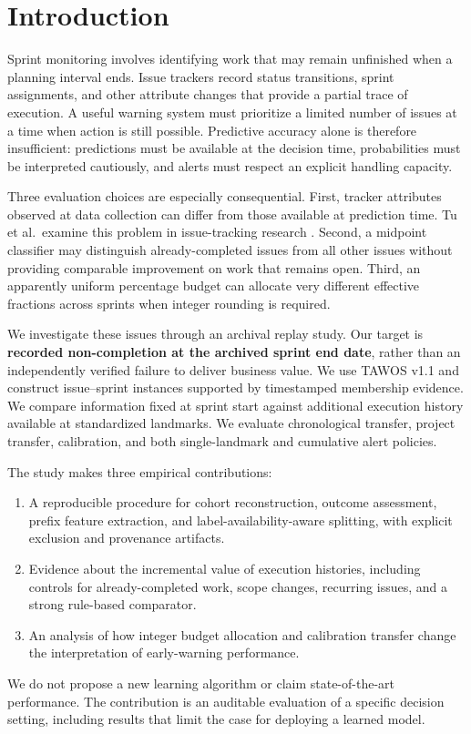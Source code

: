 \section{Introduction}\label{introduction}

Sprint monitoring involves identifying work that may remain unfinished when a planning interval ends. Issue trackers record status transitions, sprint assignments, and other attribute changes that provide a partial trace of execution. A useful warning system must prioritize a limited number of issues at a time when action is still possible. Predictive accuracy alone is therefore insufficient: predictions must be available at the decision time, probabilities must be interpreted cautiously, and alerts must respect an explicit handling capacity.

Three evaluation choices are especially consequential. First, tracker attributes observed at data collection can differ from those available at prediction time. Tu et al.~examine this problem in issue-tracking research \cite{tu2018careful}. Second, a midpoint classifier may distinguish already-completed issues from all other issues without providing comparable improvement on work that remains open. Third, an apparently uniform percentage budget can allocate very different effective fractions across sprints when integer rounding is required.

We investigate these issues through an archival replay study. Our target is \textbf{recorded non-completion at the archived sprint end date}, rather than an independently verified failure to deliver business value. We use TAWOS v1.1 \cite{tawosi2022tawos,tawosv11} and construct issue--sprint instances supported by timestamped membership evidence. We compare information fixed at sprint start against additional execution history available at standardized landmarks. We evaluate chronological transfer, project transfer, calibration, and both single-landmark and cumulative alert policies.

The study makes three empirical contributions:

\begin{enumerate}
\def\labelenumi{\arabic{enumi}.}
\tightlist
\item
  A reproducible procedure for cohort reconstruction, outcome assessment, prefix feature extraction, and label-availability-aware splitting, with explicit exclusion and provenance artifacts.
\item
  Evidence about the incremental value of execution histories, including controls for already-completed work, scope changes, recurring issues, and a strong rule-based comparator.
\item
  An analysis of how integer budget allocation and calibration transfer change the interpretation of early-warning performance.
\end{enumerate}

We do not propose a new learning algorithm or claim state-of-the-art performance. The contribution is an auditable evaluation of a specific decision setting, including results that limit the case for deploying a learned model.
